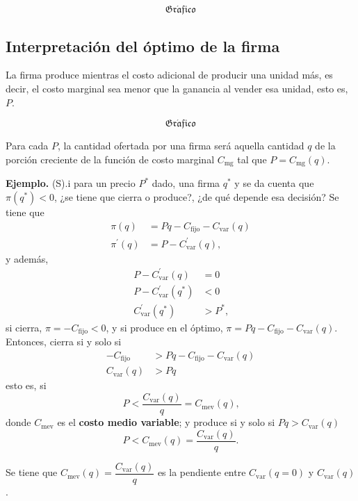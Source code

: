 \documentclass{report}
\newcommand{\GRAF}{\begin{center}$$\mathfrak{Gr\acute{a}fico}$$\end{center}}
\newenvironment{example}[1]{\noindent\setlength{\parskip}{0pt}\textbf{Ejemplo.} (#1).}{}
\begin{document}
\GRAF

\subsection{Interpretación del óptimo de la firma}

La firma produce mientras el costo adicional de producir una unidad más, es decir, el costo marginal sea menor que la ganancia al vender esa unidad, esto es, $P$.

\GRAF

Para cada $P$, la cantidad ofertada por una firma será aquella cantidad $q$ de la porción creciente de la función de costo marginal $C_\text{mg}$ tal que $P=C_\text{mg}\!\left(q\right)$.

\begin{example}
Si para un precio $P^*$ dado, una firma $q^*$ y se da cuenta que $\pi\!\left(q^*\right)<0$, ¿se tiene que cierra o produce?, ¿de qué depende esa decisión? Se tiene que
\begin{align*}
\pi\!\left(q\right) & =Pq-C_\text{fijo}-C_\text{var}\!\left(q\right) \\
\pi^{\prime}\!\left(q\right) & = P-C^\prime_\text{var}\!\left(q\right)\text{,}
\end{align*}
y además,
\begin{align*}
P-C^\prime_\text{var}\!\left(q\right) & = 0 \\
P-C^\prime_\text{var}\!\left(q^*\right) & < 0 \\
C^\prime_\text{var}\!\left(q^*\right) & > P^*\text{,}
\end{align*}
si cierra, $\pi=-C_\text{fijo}<0$, y si produce en el óptimo, $\pi=Pq-C_\text{fijo}-C_\text{var}\!\left(q\right)$. Entonces, cierra si y solo si
\begin{align*}
-C_\text{fijo} & > Pq-C_\text{fijo}-C_\text{var}\!\left(q\right) \\
C_\text{var}\!\left(q\right) & > Pq
\end{align*}
esto es, si
\[
P<\frac{C_\text{var}\!\left(q\right)}{q}=C_\text{mev}\!\left(q\right)\text{,}
\]
donde $C_\text{mev}$ es el \textbf{costo medio variable}; y produce si y solo si $Pq>C_\text{var}\!\left(q\right)$
\[
P<C_\text{mev}\!\left(q\right)=\frac{C_\text{var}\!\left(q\right)}{q}\text{.}
\]
\end{example}

Se tiene que $C_\text{mev}\!\left(q\right)=\dfrac{C_\text{var}\!\left(q\right)}{q}$ es la pendiente entre $C_\text{var}\!\left(q=0\right)$ y $C_\text{var}\!\left(q\right)$.
\end{document}
